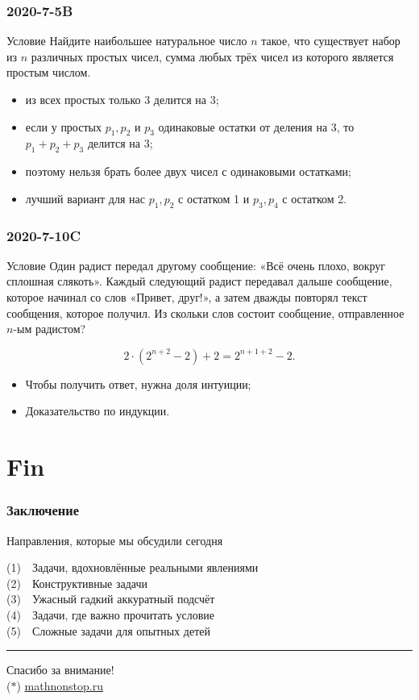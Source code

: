 \documentclass[aspectratio=1610,12pt]{beamer}
\def\ll{\left(} \def\rr{\right)}
\def\usl#1{\begin{block}{Условие} #1 \end{block} \medskip\pause}
\begin{document}
\begin{frame} \frametitle{2020-7-5B}
\usl{Найдите наибольшее натуральное число $n$ такое, что существует набор из $n$ различных простых чисел, сумма любых трёх чисел из которого является простым числом.}

\begin{itemize}
	\item из всех простых только 3 делится на 3;
	\item если у простых $p_1, p_2$ и $p_3$ одинаковые остатки от деления на 3, то $p_1+p_2+p_3$ делится на 3;
	\item поэтому нельзя брать более двух чисел с одинаковыми остатками;
	\item лучший вариант для нас $p_1, p_2$ с остатком 1 и $p_3, p_4$ с остатком 2.
\end{itemize}

\end{frame}

\begin{frame} \frametitle{2020-7-10C}
\usl{Один радист передал другому сообщение: «Всё очень плохо, вокруг сплошная слякоть». Каждый следующий радист передавал дальше сообщение, которое начинал со слов «Привет, друг!», а затем дважды повторял текст сообщения, которое получил. Из скольки слов состоит сообщение, отправленное $n$-ым радистом?}

	$$2 \cdot \ll 2^{n+2} - 2 \rr + 2 = 2^{n+1+2} - 2.$$

\begin{itemize}
	\item Чтобы получить ответ, нужна доля интуиции;
	\item Доказательство по индукции.
\end{itemize}

\end{frame}



\section[Конец]{Fin}

\def\fitem#1#2{\textcolor{hard}{\small (#1)}~~#2 \medskip \\}

\begin{frame} \frametitle{Заключение}

\textcolor{hard}{Направления, которые мы обсудили сегодня} \medskip

\fitem{1}{Задачи, вдохновлённые реальными явлениями}
\fitem{2}{Конструктивные задачи}
\fitem{3}{Ужасный гадкий аккуратный подсчёт}
\fitem{4}{Задачи, где важно прочитать условие}
\fitem{5}{Сложные задачи для опытных детей \vspace{6mm}}

\hrule
\begin{center}
	{\LARGE Спасибо за внимание!} \smallskip \\
	{\footnotesize \textcolor{hard}{($*$)\quad}
		\url{mathnonstop.ru}
		\phantom{($*$)\quad}}
\end{center} \vspace{2.4mm}
\end{frame}
\end{document}
